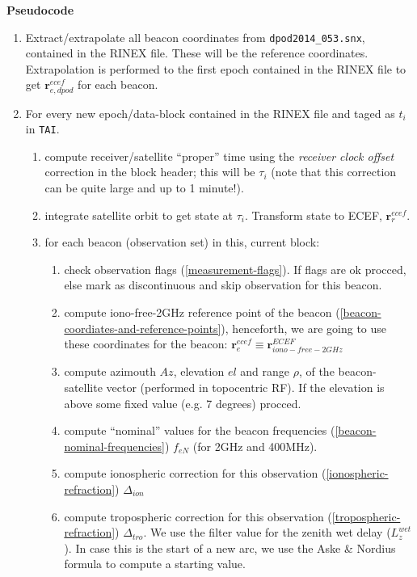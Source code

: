 \textbf{Pseudocode}
\begin{enumerate}
  
  \item Extract/extrapolate all beacon coordinates from \texttt{dpod2014\_053.snx}, 
    contained in the RINEX file. These will be the reference coordinates. 
    Extrapolation is performed to the first epoch contained in the RINEX file to 
    get $\bm{r}_{e,dpod}^{ecef}$ for each beacon.

  \item For every new epoch/data-block contained in the RINEX file and taged as $t_i$ in \texttt{TAI}.
  \begin{enumerate}
    \item compute receiver/satellite ``proper'' time using the 
    \emph{receiver clock offset} correction in the block header; this will 
     be $\tau_{i}$ (note that this correction can be quite large and up to 
     1 minute!).

    \item integrate satellite orbit to get state at {\color{red} $\tau_{i}$}. 
    Transform state to ECEF, $\bm{r}_{r}^{ecef}$.

    \item for each beacon (observation set) in this, current block:
    \begin{enumerate}
      \item check observation flags (\ref{measurement-flags}). If flags are ok 
      procced, else mark as discontinuous and skip observation for this beacon.

      \item compute iono-free-2GHz reference point of the beacon 
      (\ref{beacon-coordiates-and-reference-points}), henceforth, we are going 
      to use these coordinates for the beacon: 
      $\bm{r}_{e}^{ecef} \equiv \bm{r}_{iono-free-2GHz}^{ECEF}$

      \item compute azimouth $Az$, elevation $el$ and range $\rho$, of the 
      beacon-satellite vector (performed in topocentric RF). If the elevation 
      is above some fixed value (e.g. 7 degrees) procced.

      \item compute ``nominal'' values for the beacon frequencies 
      (\ref{beacon-nominal-frequencies}) $f_{eN}$ (for 2GHz and 400MHz).

      \item compute ionospheric correction for this observation 
      (\ref{ionospheric-refraction}) $\Delta _{ion}$

      \item compute tropospheric correction for this observation
      (\ref{tropospheric-refraction}) $\Delta _{tro}$. We use the filter value 
      for the zenith wet delay ($L_{z}^{wet}$). In case this is the start of a 
      new arc, we use the Aske \& Nordius formula to compute a starting value.
    \end{enumerate}

  \end{enumerate}
\end{enumerate}

